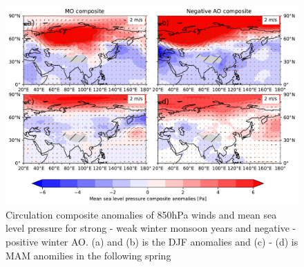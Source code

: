 \begin{figure}[htpb]
    \centering
    \includegraphics[width=\textwidth]{texfiles/figs/winter_MO_AO_composite.pdf}
    \caption{Circulation composite anomalies of 850hPa winds and mean sea level pressure for strong - weak winter monsoon years and negative - positive winter AO. (a) and (b) is the DJF anomalies and (c) - (d) is MAM anomilies in the following spring}
    \label{fig:mo_ao_composite}
\end{figure}

